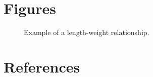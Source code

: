 \documentclass[12pt]{article}\usepackage[]{graphicx}\usepackage[]{color}
\begin{document}
\clearpage

\clearpage

\section{Figures}\label{figures}


\begin{figure}[htb]

{\centering {} 

}

\caption{Example of a length-weight relationship.}\label{fig:fig1}
\end{figure}
\clearpage

\clearpage

\section{References}\label{references}

\noindent \vspace{-2em} \setlength{\parindent}{-0.2in} \setlength{\leftskip}{0.2in} \setlength{\parskip}{8pt}
\end{document}
